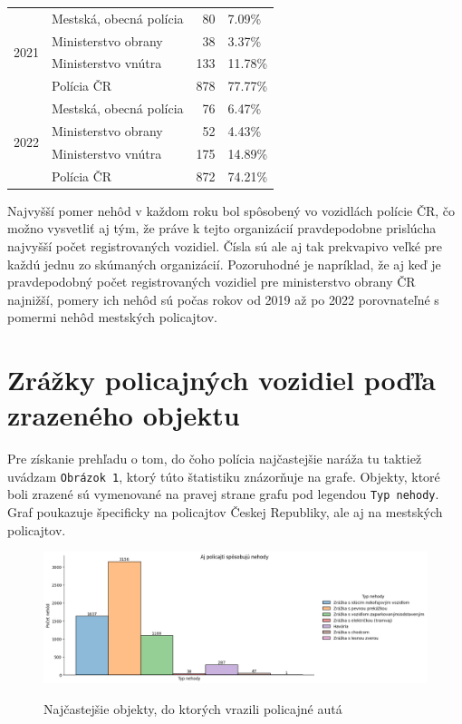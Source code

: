 \documentclass{article}
\begin{document}
\begin{table}[htb]
\begin{center}
\begin{tabular}{llrl}
\cline{1-4}
\multirow[t]{4}{*}{2021} & Mestská, obecná polícia & 80 & 7.09\% \\
 & Ministerstvo obrany & 38 & 3.37\% \\
 & Ministerstvo vnútra & 133 & 11.78\% \\
 & Polícia ČR & 878 & 77.77\% \\
\cline{1-4}
\multirow[t]{4}{*}{2022} & Mestská, obecná polícia & 76 & 6.47\% \\
 & Ministerstvo obrany & 52 & 4.43\% \\
 & Ministerstvo vnútra & 175 & 14.89\% \\
 & Polícia ČR & 872 & 74.21\% \\
\cline{1-4}
\bottomrule
\end{tabular}\label{tab:table2}
\end{center}
\end{table}

Najvyšší pomer nehôd v každom roku bol spôsobený vo vozidlách polície ČR, čo možno vysvetliť aj tým, že práve k tejto
organizácií pravdepodobne prislúcha najvyšší počet registrovaných vozidiel.
Čísla sú ale aj tak prekvapivo veľké pre každú jednu zo skúmaných organizácií.
Pozoruhodné je napríklad, že aj keď je pravdepodobný počet registrovaných vozidiel pre ministerstvo obrany ČR najnižší,
pomery ich nehôd sú počas rokov od 2019 až po 2022 porovnateľné s pomermi nehôd mestských policajtov.

\pagebreak

\section{Zrážky policajných vozidiel poďľa zrazeného objektu}\label{sec:zrazky-policajnych-vozidiel-podla-zrazeneho-objektu}

Pre získanie prehľadu o tom, do čoho polícia najčastejšie naráža tu taktiež uvádzam \texttt{Obrázok 1},
ktorý túto štatistiku znázorňuje na grafe.
Objekty, ktoré boli zrazené sú vymenované na pravej strane grafu pod legendou \texttt{Typ nehody}.
Graf poukazuje špecificky na policajtov Českej Republiky, ale aj na mestských policajtov.

\begin{figure}[htb]
 \caption{Najčastejšie objekty, do ktorých vrazili policajné autá}
 \includegraphics[scale=0.5]{fig}\label{fig:figure1}
\end{figure}
\end{document}

